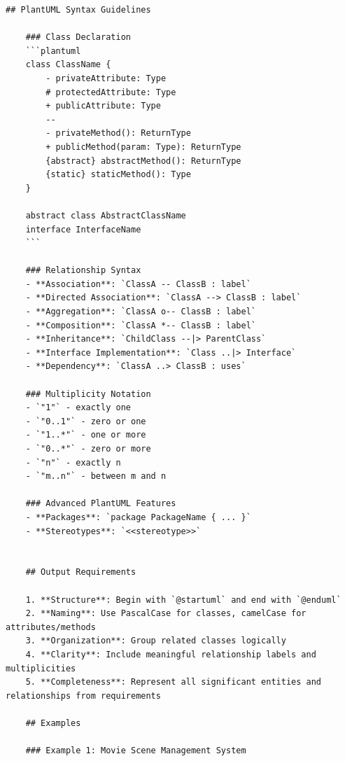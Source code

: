 \begin{lstlisting}[caption={Few-shot Chain-of-thought  Prompt}, label={lst:Few_shot_Chain_of_thought_Prompt},basicstyle=\ttfamily\tiny]
    ## PlantUML Syntax Guidelines

    ### Class Declaration
    ```plantuml
    class ClassName {
        - privateAttribute: Type
        # protectedAttribute: Type
        + publicAttribute: Type
        --
        - privateMethod(): ReturnType
        + publicMethod(param: Type): ReturnType
        {abstract} abstractMethod(): ReturnType
        {static} staticMethod(): Type
    }

    abstract class AbstractClassName
    interface InterfaceName
    ```

    ### Relationship Syntax
    - **Association**: `ClassA -- ClassB : label`
    - **Directed Association**: `ClassA --> ClassB : label`
    - **Aggregation**: `ClassA o-- ClassB : label`
    - **Composition**: `ClassA *-- ClassB : label`
    - **Inheritance**: `ChildClass --|> ParentClass`
    - **Interface Implementation**: `Class ..|> Interface`
    - **Dependency**: `ClassA ..> ClassB : uses`

    ### Multiplicity Notation
    - `"1"` - exactly one
    - `"0..1"` - zero or one
    - `"1..*"` - one or more
    - `"0..*"` - zero or more
    - `"n"` - exactly n
    - `"m..n"` - between m and n

    ### Advanced PlantUML Features
    - **Packages**: `package PackageName { ... }`
    - **Stereotypes**: `<<stereotype>>`


    ## Output Requirements

    1. **Structure**: Begin with `@startuml` and end with `@enduml`
    2. **Naming**: Use PascalCase for classes, camelCase for attributes/methods
    3. **Organization**: Group related classes logically
    4. **Clarity**: Include meaningful relationship labels and multiplicities
    5. **Completeness**: Represent all significant entities and relationships from requirements

    ## Examples

    ### Example 1: Movie Scene Management System


\end{lstlisting}

